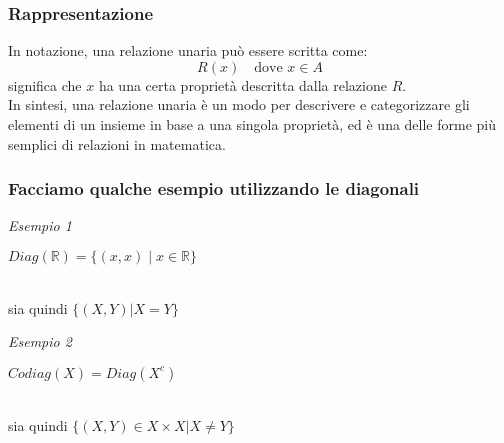 \documentclass[article,12pt]{book}
\begin{document}
\begin{enumerate}
\subsubsection{Rappresentazione}
In notazione, una relazione unaria può essere scritta come:
\[
R(x) \quad \text{dove } x \in A
\]
significa che \( x \) ha una certa proprietà descritta dalla relazione \( R \).
\\
In sintesi, una relazione unaria è un modo per descrivere e categorizzare gli elementi di un insieme in base a una singola proprietà, ed è una delle forme più semplici di relazioni in matematica.

\newpage
\subsubsection{Facciamo qualche esempio utilizzando le diagonali}
    \textit{Esempio 1} \\


\begin{center}
\begin{minipage}{0.45\textwidth}
\end{minipage}%
\hfill
\begin{minipage}{0.45\textwidth}
    $Diag$\((\mathbb{R}) = \{(x,x) \mid x \in \mathbb{R} \} \)
    
\end{minipage} \\
sia quindi $\{(X,Y)|X=Y \}$
\end{center}
\textit{Esempio 2}

\begin{center}
\begin{minipage}{0.45\textwidth}
\end{minipage}%
\hfill
\begin{minipage}{0.45\textwidth}
    $Codiag(X) = Diag (X^c)$
\end{minipage} \\
sia quindi $\{(X,Y) \in X \times X | X \neq Y \}$
\end{center}
\newpage

\end{enumerate}
\end{document}
